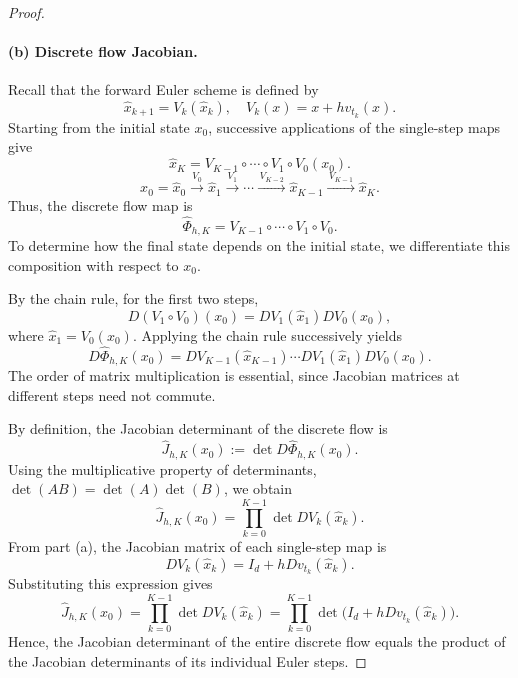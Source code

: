 \documentclass[12pt,a4paper,oneside]{book}
\begin{document}
\begin{proof}
\paragraph{(b) Discrete flow Jacobian.}

Recall that the forward Euler scheme is defined by
\begin{equation*}
    \widehat x_{k+1}=V_k(\widehat x_k), \quad V_k(x)=x+h v_{t_k}(x).
\end{equation*}
Starting from the initial state $x_0$, successive applications of the single-step maps give
\begin{equation*}
    \widehat x_K = V_{K-1}\circ\cdots\circ V_1\circ V_0(x_0).
\end{equation*}
\begin{equation*}
    x_0=\widehat x_0
    \xrightarrow{\,V_0\,}\widehat x_1
    \xrightarrow{\,V_1\,}\cdots
    \xrightarrow{\,V_{K-2}\,}\widehat x_{K-1}
    \xrightarrow{\,V_{K-1}\,}\widehat x_K.
\end{equation*}
Thus, the discrete flow map is
\begin{equation*}
    \widehat\Phi_{h,K} = V_{K-1}\circ\cdots\circ V_1\circ V_0.
\end{equation*}
To determine how the final state depends on the initial state, we differentiate this composition with respect to $x_0$.

By the chain rule, for the first two steps,
\begin{equation*}
    D(V_1\circ V_0)(x_0) = DV_1(\widehat x_1)DV_0(x_0),
\end{equation*}
where $\widehat x_1=V_0(x_0)$. Applying the chain rule successively yields
\begin{equation*}
    D\widehat\Phi_{h,K}(x_0) = DV_{K-1}(\widehat x_{K-1})\cdots DV_1(\widehat x_1)DV_0(x_0).
\end{equation*}
The order of matrix multiplication is essential, since Jacobian matrices at different steps need not commute.

By definition, the Jacobian determinant of the discrete flow is
\begin{equation*}
    \widehat J_{h,K}(x_0) := \det D\widehat\Phi_{h,K}(x_0).
\end{equation*}
Using the multiplicative property of determinants, $\det(AB)=\det(A)\det(B)$, we obtain
\begin{equation*}
    \widehat J_{h,K}(x_0) = \prod_{k=0}^{K-1}\det DV_k(\widehat x_k).
\end{equation*}
From part (a), the Jacobian matrix of each single-step map is
\begin{equation*}
    DV_k(\widehat x_k)=I_d+hDv_{t_k}(\widehat x_k).
\end{equation*}
Substituting this expression gives
\begin{equation}
    \widehat J_{h,K}(x_0)
    =\prod_{k=0}^{K-1}\det DV_k(\widehat x_k)
    =\prod_{k=0}^{K-1}
    \det\bigl(I_d+hDv_{t_k}(\widehat x_k)\bigr).
    \label{eq:discrete-flow-jacobian}
\end{equation}
Hence, the Jacobian determinant of the entire discrete flow equals the product of the Jacobian determinants of its individual
Euler steps.



\end{proof}
\end{document}
